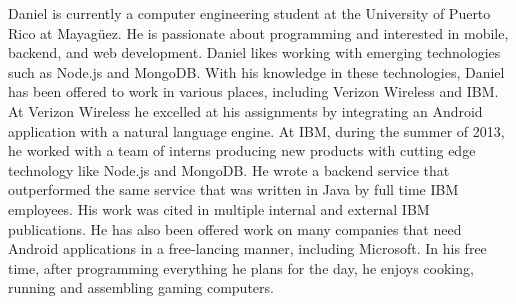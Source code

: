 
Daniel is currently a computer engineering student at the University of Puerto
Rico at Mayagüez. He is passionate about programming and interested in mobile,
backend, and web development. Daniel likes working with emerging technologies
such as Node.js and MongoDB. With his knowledge in these technologies, Daniel
has been offered to work in various places, including Verizon Wireless and IBM.
At Verizon Wireless he excelled at his assignments by integrating an Android
application with a natural language engine. At IBM, during the summer of 2013,
he worked with a team of interns producing new products with cutting edge
technology like Node.js and MongoDB. He wrote a backend service that
outperformed the same service that was written in Java by full time IBM
employees. His work was cited in multiple internal and external IBM
publications. He has also been offered work on many companies that need Android
applications in a free-lancing manner, including Microsoft. In his free time,
after programming everything he plans for the day, he enjoys cooking, running
and assembling gaming computers.
